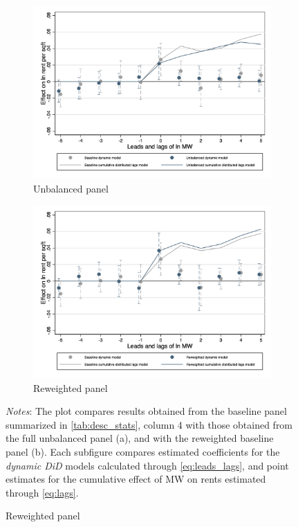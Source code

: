 \begin{figure}[htb!]
    \caption{Comparison between dynamic DiD models}
    \label{fig:dynamic_dd_comparison}
    \centering
    \begin{subfigure}[b]{0.8\textwidth}
        \caption{Unbalanced panel}
        \includegraphics[width = \textwidth]
        {../../analysis/first_differences_unbal/output/fd_model_comparison_unbal.png}
    \end{subfigure}
    \begin{subfigure}[b]{0.8\textwidth}
        \caption{Reweighted panel}
        \includegraphics[width = \textwidth]
        {../../analysis/first_differences_wgt/output/fd_model_comparison_wgt.png}
    \end{subfigure}
    \begin{minipage}{0.95\textwidth} \footnotesize
		\vspace{2mm} 
		\textit{Notes}: The plot compares results obtained from the baseline panel summarized in 
		\autoref{tab:desc_stats}, column 4 with those obtained from the full unbalanced panel (a), 
		and with the reweighted baseline panel (b). Each subfigure compares estimated coefficients 
		for the \textit{dynamic DiD} models calculated through \autoref{eq:leads_lags}, and point 
		estimates for the cumulative effect of MW on rents estimated through \autoref{eq:lags}.   
	\end{minipage}
\end{figure}


